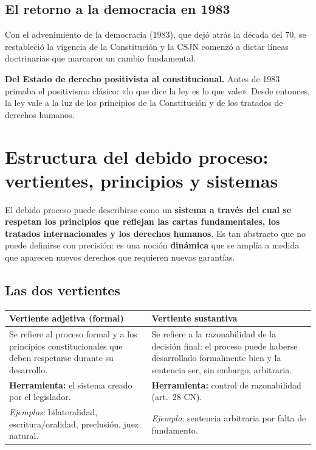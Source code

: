 \documentclass[12pt,oneside]{book}
\renewcommand{\arraystretch}{1.15}
\begin{document}
\subsection{El retorno a la democracia en 1983}

Con el advenimiento de la democracia (1983), que dejó atrás la década del 70, se restableció la vigencia de la Constitución y la CSJN comenzó a dictar líneas doctrinarias que marcaron un cambio fundamental.

\begin{important}
\textbf{Del Estado de derecho positivista al constitucional.} Antes de 1983 primaba el positivismo clásico: «lo que dice la ley es lo que vale». Desde entonces, la ley vale a la luz de los principios de la Constitución y de los tratados de derechos humanos.
\end{important}

\section{Estructura del debido proceso: vertientes, principios y sistemas}

El debido proceso puede describirse como un \textbf{sistema a través del cual se respetan los principios que reflejan las cartas fundamentales, los tratados internacionales y los derechos humanos}. Es tan abstracto que no puede definirse con precisión: es una noción \textbf{dinámica} que se amplía a medida que aparecen nuevos derechos que requieren nuevas garantías.

\subsection{Las dos vertientes}

\begin{table}[H]
\centering
\renewcommand{\arraystretch}{1.2}
\begin{tabularx}{\textwidth}{>{\RaggedRight\arraybackslash}X>{\RaggedRight\arraybackslash}X}
\toprule
\textbf{Vertiente adjetiva (formal)} & \textbf{Vertiente sustantiva} \\
\midrule
Se refiere al proceso formal y a los principios constitucionales que deben respetarse durante su desarrollo. & Se refiere a la razonabilidad de la decisión final: el proceso puede haberse desarrollado formalmente bien y la sentencia ser, sin embargo, arbitraria. \\
\addlinespace
\textbf{Herramienta:} el sistema creado por el legislador. & \textbf{Herramienta:} control de razonabilidad (art.~28 CN). \\
\addlinespace
\textit{Ejemplos:} bilateralidad, escritura/oralidad, preclusión, juez natural. & \textit{Ejemplo:} sentencia arbitraria por falta de fundamento. \\
\bottomrule
\end{tabularx}
\end{table}
\end{document}
